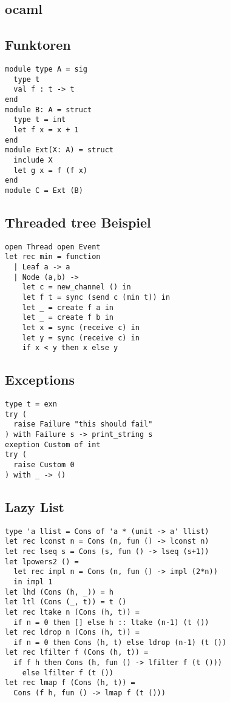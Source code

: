 \documentclass[a4paper,8pt,landscape]{extarticle}
\begin{document}
\begin{multicols*}{3}
    
    \section{ocaml}
    \subsection{Funktoren}
    \begin{verbatim}
module type A = sig
  type t
  val f : t -> t
end
module B: A = struct
  type t = int
  let f x = x + 1
end
module Ext(X: A) = struct
  include X
  let g x = f (f x)
end
module C = Ext (B)
    \end{verbatim}
    \subsection{Threaded tree Beispiel}
    \begin{verbatim}
open Thread open Event
let rec min = function
  | Leaf a -> a
  | Node (a,b) ->
    let c = new_channel () in
    let f t = sync (send c (min t)) in
    let _ = create f a in
    let _ = create f b in
    let x = sync (receive c) in
    let y = sync (receive c) in
    if x < y then x else y
    \end{verbatim}
    \subsection{Exceptions}
    \begin{verbatim}
type t = exn
try (
  raise Failure "this should fail"
) with Failure s -> print_string s
exeption Custom of int
try (
  raise Custom 0
) with _ -> ()
    \end{verbatim}
    \subsection{Lazy List}
    \begin{verbatim}
type 'a llist = Cons of 'a * (unit -> a' llist)
let rec lconst n = Cons (n, fun () -> lconst n)
let rec lseq s = Cons (s, fun () -> lseq (s+1))
let lpowers2 () =
  let rec impl n = Cons (n, fun () -> impl (2*n))
  in impl 1
let lhd (Cons (h, _)) = h
let ltl (Cons (_, t)) = t ()
let rec ltake n (Cons (h, t)) =
  if n = 0 then [] else h :: ltake (n-1) (t ())
let rec ldrop n (Cons (h, t)) =
  if n = 0 then Cons (h, t) else ldrop (n-1) (t ())
let rec lfilter f (Cons (h, t)) =
  if f h then Cons (h, fun () -> lfilter f (t ()))
    else lfilter f (t ())
let rec lmap f (Cons (h, t)) =
  Cons (f h, fun () -> lmap f (t ()))
    \end{verbatim}

\end{multicols*}
\end{document}
